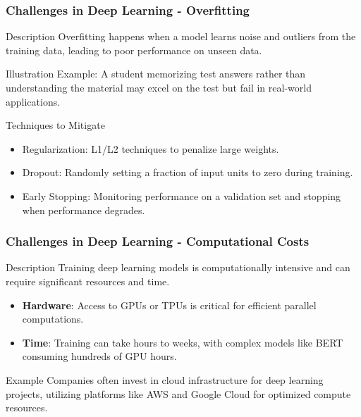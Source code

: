 \documentclass[aspectratio=169]{beamer}
\begin{document}
\begin{frame}[fragile]
    \frametitle{Challenges in Deep Learning - Overfitting}
    \begin{block}{Description}
        Overfitting happens when a model learns noise and outliers from the training data, leading to poor performance on unseen data.
    \end{block}
    \begin{block}{Illustration}
        Example: A student memorizing test answers rather than understanding the material may excel on the test but fail in real-world applications.
    \end{block}
    \begin{block}{Techniques to Mitigate}
        \begin{itemize}
            \item Regularization: L1/L2 techniques to penalize large weights.
            \item Dropout: Randomly setting a fraction of input units to zero during training.
            \item Early Stopping: Monitoring performance on a validation set and stopping when performance degrades.
        \end{itemize}
    \end{block}
\end{frame}

\begin{frame}[fragile]
    \frametitle{Challenges in Deep Learning - Computational Costs}
    \begin{block}{Description}
        Training deep learning models is computationally intensive and can require significant resources and time.
    \end{block}
    \begin{itemize}
        \item \textbf{Hardware}: Access to GPUs or TPUs is critical for efficient parallel computations.
        \item \textbf{Time}: Training can take hours to weeks, with complex models like BERT consuming hundreds of GPU hours.
    \end{itemize}
    \begin{exampleblock}{Example}
        Companies often invest in cloud infrastructure for deep learning projects, utilizing platforms like AWS and Google Cloud for optimized compute resources.
    \end{exampleblock}
\end{frame}
\end{document}
